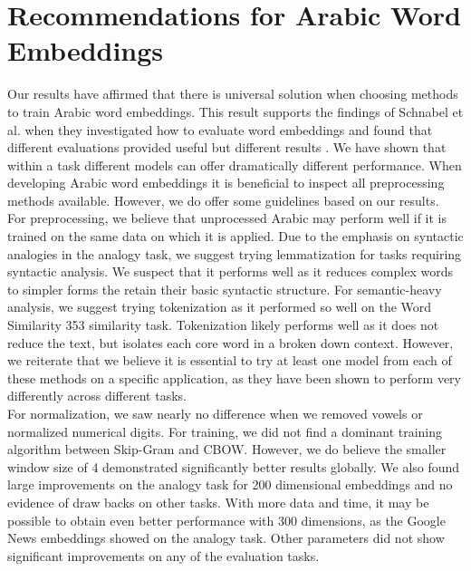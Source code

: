\section{Recommendations for Arabic Word Embeddings}
\label{sec:recommendations}

Our results have affirmed that there is universal solution when choosing methods to train Arabic word embeddings. This result supports the findings of Schnabel et al. when they investigated how to evaluate word embeddings and found that different evaluations provided useful but different results \cite{schnabel2015evaluation}. We have shown that within a task different models can offer dramatically different performance. When developing Arabic word embeddings it is beneficial to inspect all preprocessing methods available. However, we do offer some guidelines based on our results.
\\
For preprocessing, we believe that unprocessed Arabic may perform well if it is trained on the same data on which it is applied. Due to the emphasis on syntactic analogies in the analogy task, we suggest trying lemmatization for tasks requiring syntactic analysis. We suspect that it performs well as it reduces complex words to simpler forms the retain their basic syntactic structure. For semantic-heavy analysis, we suggest trying tokenization as it performed so well on the Word Similarity 353 similarity task. Tokenization likely performs well as it does not reduce the text, but isolates each core word in a broken down context. However, we reiterate that we believe it is essential to try at least one model from each of these methods on a specific application, as they have been shown to perform very differently across different tasks.
\\
For normalization, we saw nearly no difference when we removed vowels or normalized numerical digits. For training, we did not find a dominant training algorithm between Skip-Gram and CBOW. However, we do believe the smaller window size of 4 demonstrated significantly better results globally. We also found large improvements on the analogy task for 200 dimensional embeddings and no evidence of draw backs on other tasks. With more data and time, it may be possible to obtain even better performance with 300 dimensions, as the Google News embeddings showed on the analogy task. Other parameters did not show significant improvements on any of the evaluation tasks.